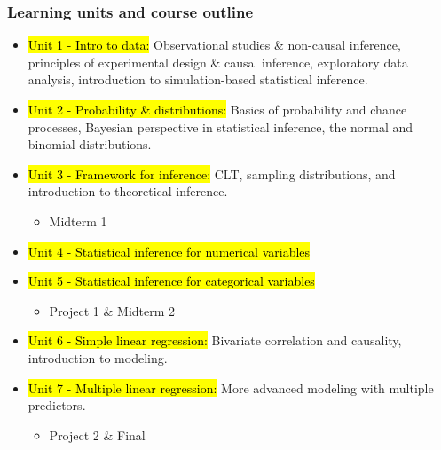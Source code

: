 \documentclass[11pt,containsverbatim,handout,xcolor=xelatex,dvipsnames,table]{beamer}
\begin{document}
\begin{frame}
\frametitle{Learning units and course outline}

{\footnotesize
\begin{itemize}[<+->]
\item \hl{Unit 1 - Intro to data:} Observational studies \& non-causal inference, 
principles of experimental design \& causal inference, exploratory data analysis, 
introduction to simulation-based statistical inference.
\item \hl{Unit 2 - Probability \& distributions:} Basics of probability and chance 
processes, Bayesian perspective in statistical inference, the normal and binomial 
distributions.
\item \hl{Unit 3 - Framework for inference:} CLT, sampling distributions, and 
introduction to theoretical inference.
\begin{itemize}
\item Midterm 1
\end{itemize}
\item \hl{Unit 4 - Statistical inference for numerical variables}
\item \hl{Unit 5 - Statistical inference for categorical variables}
\begin{itemize}
\item Project 1 \& Midterm 2
\end{itemize}
\item \hl{Unit 6 - Simple linear regression:} Bivariate correlation and causality, 
introduction to modeling.
\item \hl{Unit 7 - Multiple linear regression:} More advanced modeling with multiple 
predictors.
\begin{itemize}
\item Project 2 \& Final
\end{itemize}
\end{itemize}
}


\end{frame}
\end{document}
